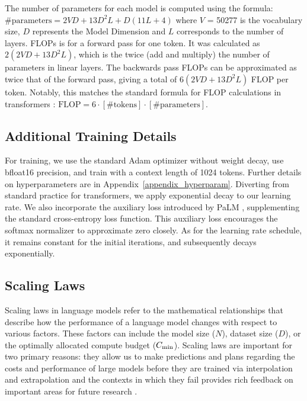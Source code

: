 \documentclass[11pt]{article}
\begin{document}
The number of parameters for each model is computed using the formula:  $\text{\# parameters} = 2VD + 13D^2L + D(11L+4)$ where $V$ = 50277 is the vocabulary size, $D$ represents the Model Dimension and $L$ corresponds to the number of layers. FLOPs is for a forward pass for one token. It was calculated as $2(2VD + 13D^2L)$, which is the twice (add and multiply) the number of parameters in linear layers. The backwards pass FLOPs can be approximated as twice that of the forward pass, giving a total of $6(2VD + 13D^2L)$ FLOP per token. Notably, this matches the standard formula for FLOP calculations in transformers \citet{kaplan2020scaling}: $\text{FLOP} = 6\cdot [\text{\# tokens}]\cdot [\text{\# parameters}]$.

\subsection{Additional Training Details}

For training, we use the standard Adam optimizer without weight decay, use bfloat16 precision, and train with a context length of 1024 tokens. Further details on hyperparameters are in Appendix~\ref{appendix_hyperparam}. Diverting from standard practice for transformers, we apply exponential decay to our learning rate. We also incorporate the auxiliary loss introduced by PaLM \cite{PaLM}, supplementing the standard cross-entropy loss function. This auxiliary loss encourages the softmax normalizer to approximate zero closely. As for the learning rate schedule, it remains constant for the initial iterations, and subsequently decays exponentially. 


\subsection{Scaling Laws}

Scaling laws \cite{kaplan2020scaling,henighan2020scaling,hoffmann2022training,muennighoff2023scaling} in language models refer to the mathematical relationships that describe how the performance of a language model changes with respect to various factors. These factors can include the model size ($N$), dataset size ($D$), or the optimally allocated compute budget ($C_{\rm min}$). Scaling laws are important for two primary reasons: they allow us to make predictions and plans regarding the costs and performance of large models before they are trained via interpolation and extrapolation \cite{black2022gpta,le2022language} and the contexts in which they fail provides rich feedback on important areas for future research \cite{Wei2022EmergentAO,biderman2023emergent}.
\end{document}
